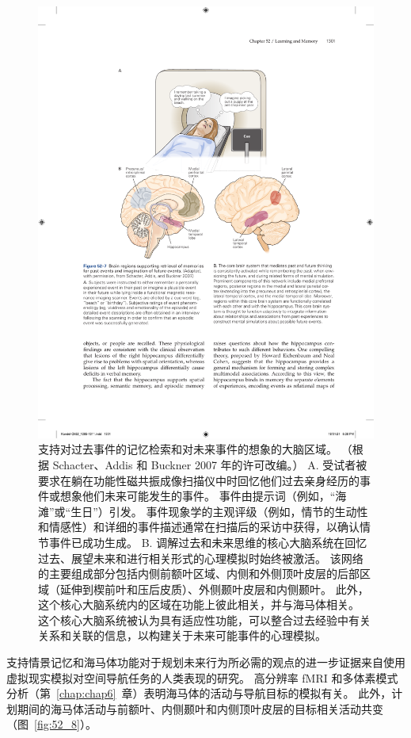 \begin{figure}[htbp]
	\centering
	\includegraphics[width=0.7\linewidth]{chap52/fig_52_7}
	\caption{支持对过去事件的记忆检索和对未来事件的想象的大脑区域。 （根据 Schacter、Addis 和 Buckner 2007 年的许可改编。） A. 受试者被要求在躺在功能性磁共振成像扫描仪中时回忆他们过去亲身经历的事件或想象他们未来可能发生的事件。 事件由提示词（例如，“海滩”或“生日”）引发。 事件现象学的主观评级（例如，情节的生动性和情感性）和详细的事件描述通常在扫描后的采访中获得，以确认情节事件已成功生成。 B. 调解过去和未来思维的核心大脑系统在回忆过去、展望未来和进行相关形式的心理模拟时始终被激活。 该网络的主要组成部分包括内侧前额叶区域、内侧和外侧顶叶皮层的后部区域（延伸到楔前叶和压后皮质）、外侧颞叶皮层和内侧颞叶。 此外，这个核心大脑系统内的区域在功能上彼此相关，并与海马体相关。 这个核心大脑系统被认为具有适应性功能，可以整合过去经验中有关关系和关联的信息，以构建关于未来可能事件的心理模拟。}
	\label{fig:52_7}
\end{figure}


支持情景记忆和海马体功能对于规划未来行为所必需的观点的进一步证据来自使用虚拟现实模拟对空间导航任务的人类表现的研究。
高分辨率 fMRI 和多体素模式分析（第~\ref{chap:chap6}~章）表明海马体的活动与导航目标的模拟有关。
此外，计划期间的海马体活动与前额叶、内侧颞叶和内侧顶叶皮层的目标相关活动共变（图~\ref{fig:52_8}）。


